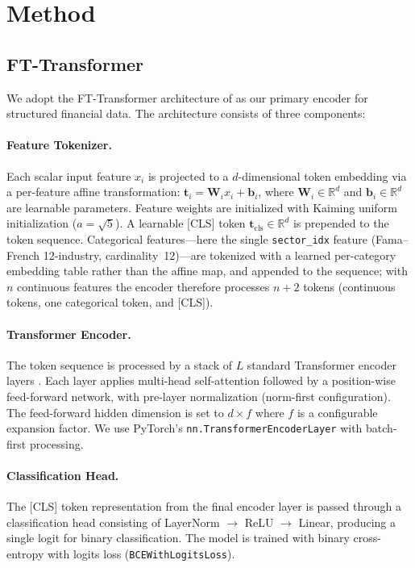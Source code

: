 \section{Method}
\label{sec:method}

\subsection{FT-Transformer}
\label{sec:ft_transformer}

We adopt the FT-Transformer architecture of \citet{gorishniy2021revisiting} as our primary encoder for structured financial data. The architecture consists of three components:

\paragraph{Feature Tokenizer.} Each scalar input feature $x_i$ is projected to a $d$-dimensional token embedding via a per-feature affine transformation: $\mathbf{t}_i = \mathbf{W}_i x_i + \mathbf{b}_i$, where $\mathbf{W}_i \in \mathbb{R}^d$ and $\mathbf{b}_i \in \mathbb{R}^d$ are learnable parameters. Feature weights are initialized with Kaiming uniform initialization ($a = \sqrt{5}$). A learnable \textsc{[CLS]} token $\mathbf{t}_{\mathrm{cls}} \in \mathbb{R}^d$ is prepended to the token sequence. Categorical features---here the single \texttt{sector\_idx} feature (Fama--French 12-industry, cardinality~12)---are tokenized with a learned per-category embedding table rather than the affine map, and appended to the sequence; with $n$ continuous features the encoder therefore processes $n + 2$ tokens (continuous tokens, one categorical token, and \textsc{[CLS]}).

\paragraph{Transformer Encoder.} The token sequence is processed by a stack of $L$ standard Transformer encoder layers \citep{vaswani2017attention}. Each layer applies multi-head self-attention followed by a position-wise feed-forward network, with pre-layer normalization (norm-first configuration). The feed-forward hidden dimension is set to $d \times f$ where $f$ is a configurable expansion factor. We use PyTorch's \texttt{nn.TransformerEncoderLayer} with batch-first processing.

\paragraph{Classification Head.} The \textsc{[CLS]} token representation from the final encoder layer is passed through a classification head consisting of LayerNorm $\rightarrow$ ReLU $\rightarrow$ Linear, producing a single logit for binary classification. The model is trained with binary cross-entropy with logits loss (\texttt{BCEWithLogitsLoss}).

